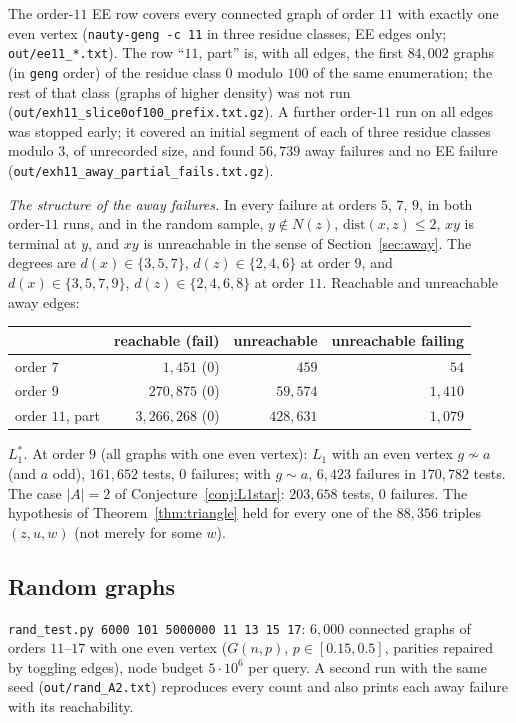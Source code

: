 \documentclass[11pt]{amsart}
\theoremstyle{definition}
\begin{document}
The order-$11$ EE row covers every connected graph of order $11$ with exactly one even vertex
(\texttt{nauty-geng -c 11} in three residue classes, EE edges only; \texttt{out/ee11\_*.txt}). The
row ``$11$, part'' is, with all edges, the first $84{,}002$ graphs (in \texttt{geng} order) of the
residue class $0$ modulo $100$ of the same enumeration; the rest of that class (graphs of higher
density) was not run (\texttt{out/exh11\_slice0of100\_prefix.txt.gz}). A further order-$11$ run on all edges was stopped early; it
covered an initial segment of each of three residue classes modulo $3$, of unrecorded size, and found
$56{,}739$ away failures and no EE failure (\texttt{out/exh11\_away\_partial\_fails.txt.gz}).

\emph{The structure of the away failures.} In every failure at orders $5$, $7$, $9$, in both order-$11$
runs, and in the random sample, $y\notin N(z)$, $\mathrm{dist}(x,z)\le2$, $xy$ is terminal at $y$, and
$xy$ is unreachable in the sense of Section~\ref{sec:away}. The degrees are $d(x)\in\{3,5,7\}$,
$d(z)\in\{2,4,6\}$ at order $9$, and $d(x)\in\{3,5,7,9\}$, $d(z)\in\{2,4,6,8\}$ at order $11$.
Reachable and unreachable away edges:
\begin{center}
\begin{tabular}{lrrr}
\toprule
 & reachable (fail) & unreachable & unreachable failing \\
\midrule
order $7$ & $1{,}451$ (0) & $459$ & $54$ \\
order $9$ & $270{,}875$ (0) & $59{,}574$ & $1{,}410$ \\
order $11$, part & $3{,}266{,}268$ (0) & $428{,}631$ & $1{,}079$ \\
\bottomrule
\end{tabular}
\end{center}

\emph{$L_1^*$.} At order $9$ (all graphs with one even vertex): $L_1$ with an even vertex $g\not\sim a$ (and $a$ odd), $161{,}652$
tests, $0$ failures; with $g\sim a$, $6{,}423$ failures in $170{,}782$ tests. The case $|A|=2$ of
Conjecture~\ref{conj:L1star}: $203{,}658$ tests, $0$ failures. The hypothesis of
Theorem~\ref{thm:triangle} held for every one of the $88{,}356$ triples $(z,u,w)$ (not merely for some
$w$).

\subsection*{Random graphs}
\texttt{rand\_test.py 6000 101 5000000 11 13 15 17}: $6{,}000$ connected graphs of orders
$11$--$17$ with one even vertex ($G(n,p)$, $p\in[0.15,0.5]$, parities repaired by toggling edges),
node budget $5\cdot10^6$ per query. A second run with the same seed (\texttt{out/rand\_A2.txt})
reproduces every count and also prints each away failure with its reachability.
\end{document}
